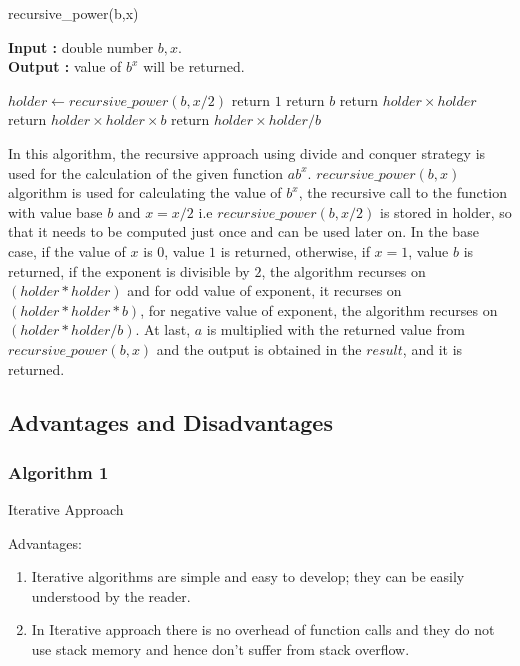 \documentclass[12pt, a4paper]{article}
\begin{document}
\begin{algorithm}[hbt!]
\caption{recursive\_power(b,x)}\label{alg:two}

\hspace*{\algorithmicindent} \textbf{Input : }double number $b,x$. \\
\hspace*{\algorithmicindent} \textbf{Output : }value of $b^x$ will be returned.
\begin{algorithmic}[1]
\STATE $holder \gets recursive\_power(b,x/2)$
  \STATE return $1$
  \STATE return $b$
  \STATE return $holder \times holder$
  \STATE return $holder \times holder \times b$
\ELSE
  \STATE return $holder \times holder {/} b$
\ENDIF
\end{algorithmic}
\end{algorithm}

In this algorithm, the recursive approach using divide and conquer strategy is used for the calculation of the given function $ab^x$. $recursive\_power(b,x)$ algorithm is used for calculating the value of $b^x$, the recursive call to the function with value base $b$ and $x = x/2$ i.e $recursive\_power(b,x/2)$ is stored in holder, so that it needs to be computed just once and can be used later on. In the base case, if the value of $x$ is 0, value $1$ is returned, otherwise, if $x=1$, value $b$ is returned, if the exponent is divisible by $2$, the algorithm recurses on $(holder * holder)$ and for odd value of exponent, it recurses on $(holder * holder * b)$, for negative value of exponent, the algorithm recurses on $(holder * holder / b)$. At last, $a$ is multiplied with the returned value from $recursive\_power(b,x)$ and the output is obtained in the $result$, and it is returned.

\newpage

\subsection{Advantages and Disadvantages}



\subsubsection{Algorithm 1}
Iterative Approach

Advantages:
\begin{enumerate}
    \item {Iterative algorithms are simple and easy to develop; they can be easily understood by the reader.}
    \item {In Iterative approach there is no overhead of function calls and they do not use stack memory and hence don’t suffer from stack overflow.}
    
\end{enumerate}
\end{document}

